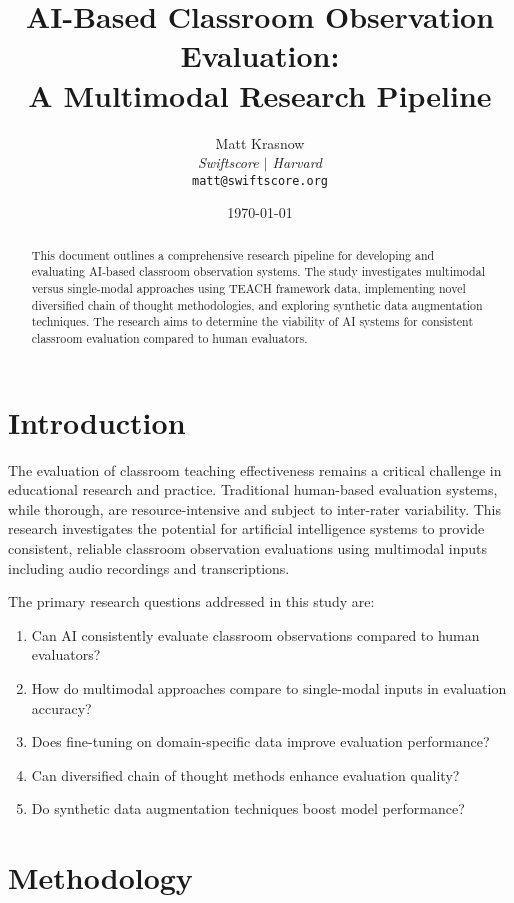 \documentclass[12pt]{article}
\title{\textbf{AI-Based Classroom Observation Evaluation: \\
A Multimodal Research Pipeline}}
\author{Matt Krasnow \\
\textit{Swiftscore $\mid$ Harvard} \\
\texttt{matt@swiftscore.org}}
\date{\today}
\begin{document}
\maketitle

\begin{abstract}
This document outlines a comprehensive research pipeline for developing and evaluating AI-based classroom observation systems. The study investigates multimodal versus single-modal approaches using TEACH framework data, implementing novel diversified chain of thought methodologies, and exploring synthetic data augmentation techniques. The research aims to determine the viability of AI systems for consistent classroom evaluation compared to human evaluators.
\end{abstract}

\tableofcontents
\newpage

\section{Introduction}

The evaluation of classroom teaching effectiveness remains a critical challenge in educational research and practice. Traditional human-based evaluation systems, while thorough, are resource-intensive and subject to inter-rater variability. This research investigates the potential for artificial intelligence systems to provide consistent, reliable classroom observation evaluations using multimodal inputs including audio recordings and transcriptions.

The primary research questions addressed in this study are:
\begin{enumerate}
    \item Can AI consistently evaluate classroom observations compared to human evaluators?
    \item How do multimodal approaches compare to single-modal inputs in evaluation accuracy?
    \item Does fine-tuning on domain-specific data improve evaluation performance?
    \item Can diversified chain of thought methods enhance evaluation quality?
    \item Do synthetic data augmentation techniques boost model performance?
\end{enumerate}

\section{Methodology}
\end{document}
